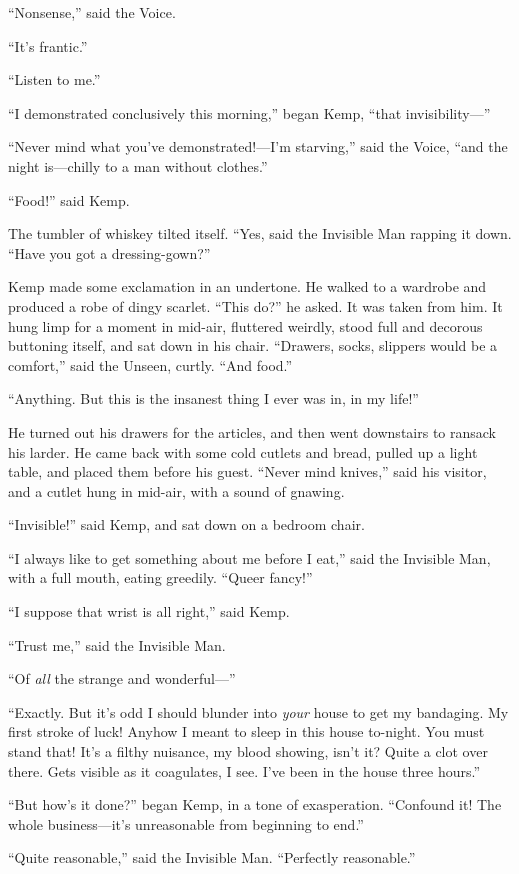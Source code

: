 “Nonsense,” said the Voice.

“It’s frantic.”

“Listen to me.”

“I demonstrated conclusively this morning,” began Kemp, “that invisibility—”

“Never mind what you’ve demonstrated!—I’m starving,” said the Voice, “and the night is—chilly to a man without clothes.”

“Food!” said Kemp.

The tumbler of whiskey tilted itself. “Yes, said the Invisible Man rapping it down. “Have you got a dressing-gown?”

Kemp made some exclamation in an undertone. He walked to a wardrobe and produced a robe of dingy scarlet. “This do?” he asked. It was taken from him. It hung limp for a moment in mid-air, fluttered weirdly, stood full and decorous buttoning itself, and sat down in his chair. “Drawers, socks, slippers would be a comfort,” said the Unseen, curtly. “And food.”

“Anything. But this is the insanest thing I ever was in, in my life!”

He turned out his drawers for the articles, and then went downstairs to ransack his larder. He came back with some cold cutlets and bread, pulled up a light table, and placed them before his guest. “Never mind knives,” said his visitor, and a cutlet hung in mid-air, with a sound of gnawing.

“Invisible!” said Kemp, and sat down on a bedroom chair.

“I always like to get something about me before I eat,” said the Invisible Man, with a full mouth, eating greedily. “Queer fancy!”

“I suppose that wrist is all right,” said Kemp.

“Trust me,” said the Invisible Man.

“Of \emph{all} the strange and wonderful—”

“Exactly. But it’s odd I should blunder into \emph{your} house to get my bandaging. My first stroke of luck! Anyhow I meant to sleep in this house to-night. You must stand that! It’s a filthy nuisance, my blood showing, isn’t it? Quite a clot over there. Gets visible as it coagulates, I see. I’ve been in the house three hours.”

“But how’s it done?” began Kemp, in a tone of exasperation. “Confound it! The whole business—it’s unreasonable from beginning to end.”

“Quite reasonable,” said the Invisible Man. “Perfectly reasonable.”

